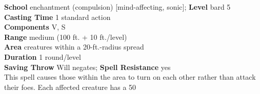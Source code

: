 \textbf{School} enchantment (compulsion) [mind-affecting, sonic]; \textbf{Level} bard 5\\
\textbf{Casting Time} 1 standard action\\
\textbf{Components} V, S\\
\textbf{Range }medium (100 ft. + 10 ft./level)\\
\textbf{Area} creatures within a 20-ft.-radius spread\\
\textbf{Duration} 1 round/level\\
\textbf{Saving Throw }Will negates; \textbf{Spell Resistance} yes\\
This spell causes those within the area to turn on each other rather than attack their foes. Each affected creature has a 50%
